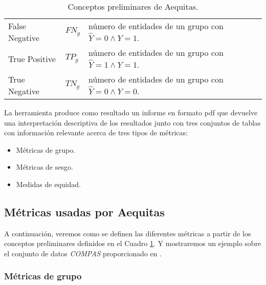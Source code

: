 \begin{table}[h]
{\begin{tabular}{lll}
False Negative       & $FN_g$                               & número de entidades de un grupo con $\hat{Y}=0 \wedge Y=1$.                                     \\
True Positive        & $TP_g$                               & número de entidades de un grupo con $\hat{Y}=1 \wedge Y=1$.                                     \\
True Negative        & $TN_g$                               & número de entidades de un grupo con $\hat{Y}=0 \wedge Y=0$.                                     \\ \hline
\end{tabular}
}
\caption{Conceptos preliminares de Aequitas.}
\label{tab:pretable}
\end{table}

La herramienta produce como resultado un informe en formato pdf que devuelve una interpretación descriptiva de los resultados junto con tres conjuntos de tablas con información relevante acerca de tres tipos de métricas:

\begin{itemize}
    \item Métricas de grupo.
    \item Métricas de sesgo.
    \item Medidas de equidad.
\end{itemize}

\subsection{Métricas usadas por Aequitas}

A continuación, veremos como se definen las diferentes métricas a partir de los conceptos preliminares definidos en el Cuadro \ref{tab:pretable}. Y mostraremos un ejemplo sobre el conjunto de datos \textit{COMPAS} proporcionado en \cite{aequitasdoc}.

\subsubsection{Métricas de grupo}

